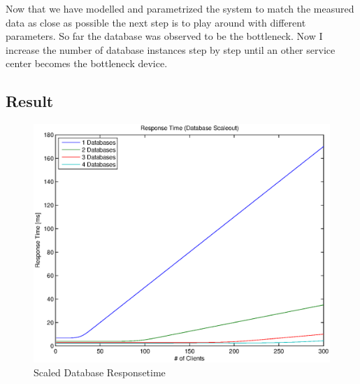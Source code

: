 \documentclass[a4paper]{article}
\begin{document}
Now that we have modelled and parametrized the system to match the measured data as close as possible the next step is to play around with different parameters. So far the database was observed to be the bottleneck. Now I increase the number of database instances step by step until an other service center becomes the bottleneck device.


\subsection{Result}


\begin{figure}[H]
	\begin{center}
    \includegraphics[scale=0.6]{../plots-ms2-mg/dbscaleout-rt.eps}
  \end{center}
  \caption{Scaled Database Responsetime}
  \label{fig:dbscaleout-rt}
\end{figure}


\end{document}
